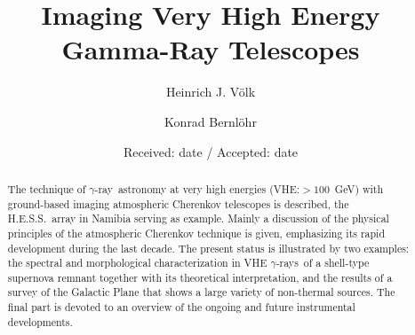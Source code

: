 \documentclass{svjour3x}                     %
\newcommand{\gr}{$\gamma$-ray}
\newcommand{\grs}{$\gamma$-rays}
\newcommand{\hess}{H.E.S.S.}
\begin{document}
\title{Imaging Very High Energy Gamma-Ray Telescopes}



\author{Heinrich J. V\"olk         \and
        Konrad Bernl\"ohr
}



\date{Received: date / Accepted: date}


\maketitle

\begin{abstract}
  The technique of \gr\ astronomy at very high energies (VHE:$>100$~GeV) with
  ground-based imaging atmospheric Cherenkov telescopes is described, the
  \hess\ array in Namibia serving as example. Mainly a discussion of the
  physical principles of the atmospheric Cherenkov technique is given,
  emphasizing its rapid development during the last decade. The present status
  is illustrated by two examples: the spectral and morphological
  characterization in VHE \grs\ of a shell-type supernova remnant together with
  its theoretical interpretation, and the results of a survey of the
  Galactic Plane that shows a large variety of non-thermal sources. The final
  part is devoted to an overview of the ongoing and future instrumental
  developments.


\end{abstract}
\end{document}
